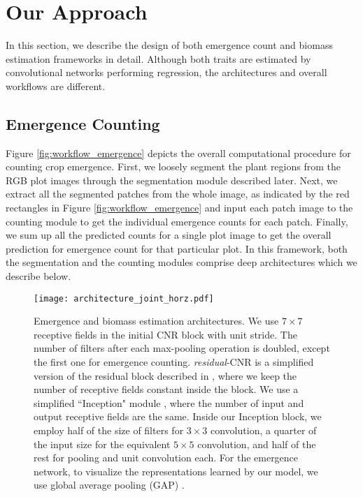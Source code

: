 \documentclass[10pt,twocolumn,letterpaper]{article}
\begin{document}
\section{Our Approach}
\label{sec:approach}
In this section, we describe the design of both emergence count and biomass estimation frameworks in detail. Although both traits are estimated by convolutional networks performing regression, the architectures and overall workflows are different.

\subsection{Emergence Counting}
Figure \ref{fig:workflow_emergence} depicts the overall computational procedure for counting crop emergence. First, we loosely segment the plant regions from the RGB plot images through the segmentation module described later. Next, we extract all the segmented patches from the whole image, as indicated by the red rectangles in Figure \ref{fig:workflow_emergence} and input each patch image to the counting module to get the individual emergence counts for each patch. Finally, we sum up all the predicted counts for a single plot image to get the overall prediction for emergence count for that particular plot. In this framework, both the segmentation and the counting modules comprise deep architectures which we describe below.


\begin{figure*}[t!]
	\centering
	\texttt{[image: architecture\_joint\_horz.pdf]}
    \caption{Emergence and biomass estimation architectures. We use $7\times 7$ receptive fields in the initial CNR block with unit stride. The number of filters after each max-pooling operation is doubled, except the first one for emergence counting. \textit{residual}-CNR is a simplified version of the residual block described in \cite{resnet}, where we keep the number of receptive fields constant inside the block. We use a simplified ``Inception" module \cite{inception-02}, where the number of input and output receptive fields are the same. Inside our Inception block, we employ half of the size of filters for $3\times3$ convolution, a quarter of the input size for the equivalent $5\times 5$ convolution, and half of the rest for pooling and unit convolution each. For the emergence network, to visualize the representations learned by our model, we use global average pooling (GAP) \cite{nin}.}
    \label{fig:arch_joint}
\end{figure*}
\end{document}
